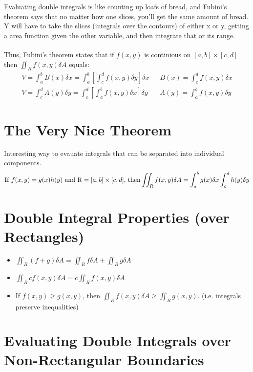 \documentclass{article}
\begin{document}
Evaluating double integrals is like counting up loafs of bread, and Fubini's theorem says that no matter how one slices, you'll get the same amount of bread. Y will have to take the slices (integrals over the contours) of either x or y, getting a area function given the other variable, and then integrate that or its range. \\ ~ \\
Thus, Fubini's theorem states that if $f(x, y)$ is continious on $[a, b] \times [c, d]$ then $\iint_{R} f(x, y) \delta A$ equals:
\begin{align*}
    V = \int_{a}^{b} B(x) \delta x = \int_{a}^{b} \left[ \int_{c}^{d} f(x,y) \delta y \right] \delta x  &  & B(x) = \int_{c}^{d} f(x, y) \delta x \\
    V = \int_{c}^{d} A(y) \delta y = \int_{c}^{d} \left[ \int_{a}^{b} f(x, y) \delta x \right] \delta y &  & A(y) = \int_{a}^{b} f(x, y) \delta y
\end{align*}


\section {The Very Nice Theorem}

Interesting way to evauate integrals that can be separated into individual components.
$$\text{If } f(x, y) = g(x)h(y) \text{ and R} = [a, b] \times [c, d] \text{, then} \\ \iint_{R} f(x, y) \delta A = \int_{a}^{b} g(x) \delta x \int_{c}^{d} h(y) \delta y $$

\section{Double Integral Properties (over Rectangles)}

\begin{itemize}
    \item  $\iint_{R} (f + g) \delta A = \iint_{R} f \delta A + \iint_{R} g \delta A$
    \item $\iint_{R} cf(x,y) \delta A = c \iint_{R} f(x, y) \delta A$
    \item If $f(x, y) \ge g(x, y)$, then $\iint_{R} f(x, y) \delta A \ge \iint_{R} g(x, y)$. (i.e. integrals preserve inequalities)
\end{itemize}

\section{Evaluating Double Integrals over Non-Rectangular Boundaries}
\end{document}
